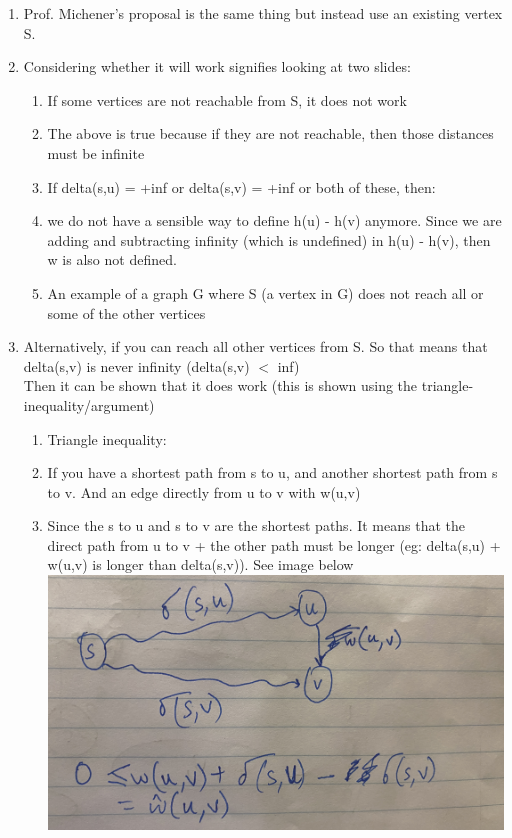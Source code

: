 \documentclass[11pt]{article}
\begin{document}
\begin{enumerate}
\begin{enumerate}
\end{enumerate}
\begin{enumerate}
    \item Prof. Michener's proposal is the same thing but instead use an existing vertex S.
    \item Considering whether it will work signifies looking at two slides:
    \begin{enumerate}
        \item If some vertices are not reachable from S, it does not work
        \item The above is true because if they are not reachable, then those distances must be infinite
        \item If delta(s,u) = +inf or delta(s,v) = +inf or both of these, then:
        \item we do not have a sensible way to define h(u) - h(v) anymore. Since we are adding and subtracting infinity (which is undefined) in h(u) - h(v), then w is also not defined.
        \item An example of a graph G where S (a vertex in G) does not reach all or some of the other vertices
    \end{enumerate}
    \item Alternatively, if you can reach all other vertices from S. So that means that delta(s,v) is never infinity (delta(s,v) $<$ inf)\\
    Then it can be shown that it does work (this is shown using the triangle-inequality/argument)
    \begin{enumerate}
        \item Triangle inequality:
        \item If you have a shortest path from s to u, and another shortest path from s to v. And an edge directly from u to v with w(u,v)
        \item Since the s to u and s to v are the shortest paths. It means that the direct path from u to v + the other path must be longer (eg: delta(s,u) + w(u,v) is longer than delta(s,v)). See image below\\ \includegraphics[scale=0.1]{IMG_8541.JPG}

\end{enumerate}
\end{enumerate}
\end{enumerate}
\end{document}
